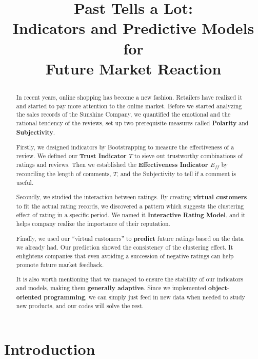 \documentclass[12pt]{article}  %
\title{
  \begin{flushleft}
    \huge
    \quad Past Tells a Lot:\\Indicators and Predictive Models for\\
  \hspace{6.5cm} Future Market Reaction 
  \end{flushleft}
}  %
\begin{document}
\begin{abstract}
  In recent years, online shopping has become a new fashion. Retailers have realized it and started to pay more attention to the online market.
  Before we started analyzing the sales records of the Sunshine Company, we quantified the emotional and the rational tendency of the reviews, set up two prerequisite measures called \textbf{Polarity} and \textbf{Subjectivity}.
  
  Firstly, we designed indicators by Bootstrapping to measure the effectiveness of a review. We defined our \textbf{Trust Indicator $T$} to sieve out trustworthy combinations of ratings and reviews. Then we established the\textbf{ Effectiveness Indicator $E_{ff}$} by reconciling the length of comments, $T$, and the Subjectivity to tell if a comment is useful.
  
  Secondly, we studied the interaction between ratings. By creating \textbf{virtual customers} to fit the actual rating records, we discovered a pattern which suggests the clustering effect of rating in a specific period. We named it \textbf{Interactive Rating Model}, and it helps company realize the importance of their reputation.
  
  Finally, we used our “virtual customers” to \textbf{predict} future ratings based on the data we already had. Our prediction showed the consistency of the clustering effect. It enlightens companies that even avoiding a succession of negative ratings can help promote future market feedback.
  
It is also worth mentioning that we managed to ensure the stability of our indicators and models, making them \textbf{generally adaptive}. Since we implemented \textbf{object-oriented programming}, we can simply just feed in new data when needed to study new products, and our codes will solve the rest.


\end{abstract}

\maketitle  %
\tableofcontents  %


\section{Introduction}
\end{document}
